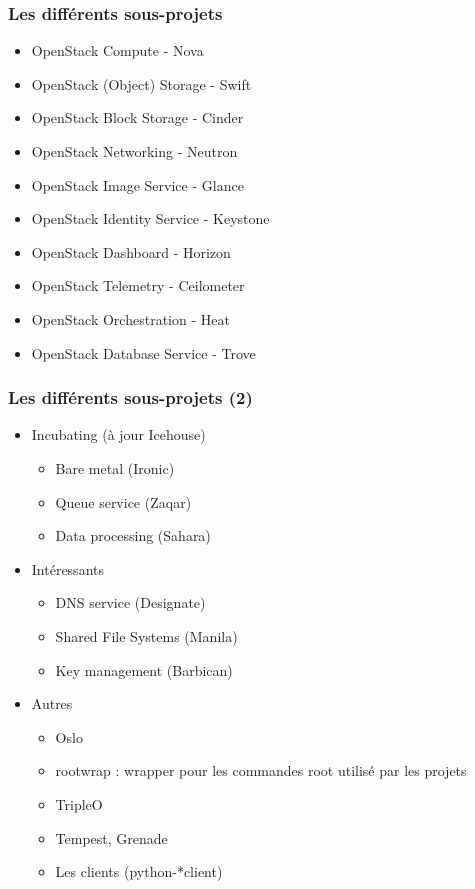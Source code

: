   \begin{frame}
    \frametitle{Les différents sous-projets}
    \begin{itemize}
        \item OpenStack Compute - Nova
        \item OpenStack (Object) Storage - Swift\pause
        \item OpenStack Block Storage - Cinder\pause
        \item OpenStack Networking - Neutron\pause
        \item OpenStack Image Service - Glance\pause
        \item OpenStack Identity Service - Keystone\pause
        \item OpenStack Dashboard - Horizon\pause
        \item OpenStack Telemetry - Ceilometer\pause
        \item OpenStack Orchestration - Heat\pause
        \item OpenStack Database Service - Trove
    \end{itemize}
  \end{frame}

  \begin{frame}
    \frametitle{Les différents sous-projets (2)}
    \begin{itemize}
      \item Incubating (à jour Icehouse)
      \begin{itemize}
        \item Bare metal (Ironic)
        \item Queue service (Zaqar)
        \item Data processing (Sahara)
      \end{itemize}\pause
      \item Intéressants
      \begin{itemize}
        \item DNS service (Designate)
        \item Shared File Systems (Manila)
        \item Key management (Barbican)
      \end{itemize}\pause
      \item Autres
      \begin{itemize}
        \item Oslo
        \item rootwrap : wrapper pour les commandes root utilisé par les projets
        \item TripleO
        \item Tempest, Grenade
        \item Les clients (python-*client)
      \end{itemize}
    \end{itemize}
  \end{frame}

